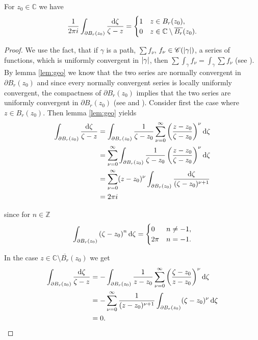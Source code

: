\begin{enumerate}[label = \textbf{Exercise \arabic*.},wide = 0pt, itemsep=1.5ex]
	\begin{proposition}
		For $z_0 \in \mathbb{C}$ we have
		\begin{align}
			\frac{1}{2\pi i}\int_{\partial B_r(z_0)} \frac{\mathop{}\!\mathrm{d} \zeta}{\zeta - z} = \begin{cases}
				1 & z \in B_r(z_0),\\
				0 & z \in \mathbb{C} \setminus \overline{B_r}(z_0).
			\end{cases}
		\end{align}
	\end{proposition}

	\begin{proof}
		We use the fact, that if $\gamma$ is a path, $\sum f_\nu$, $f_\nu \in \mathscr{C}(\abs[0]{\gamma})$, a series of functions, which is uniformly convergent in $\abs[0]{\gamma}$, then $\sum\int_\gamma f_\nu = \int_\gamma \sum f_\nu$ (see \cite[163]{remmert2002funktionentheorie}). By lemma \ref{lem:geo} we know that the two series are normally convergent in $\partial B_r(z_0)$ and since every normally convergent series is locally uniformly convergent, the compactness of $\partial B_r(z_0)$ implies that the two series are uniformly convergent in $\partial B_r(z_0)$ (see \cite[92]{remmert2002funktionentheorie} and \cite[85]{remmert2002funktionentheorie}). Consider first the case where $z \in B_r(z_0)$. Then lemma \ref{lem:geo} yields
		\begin{align*}
			\int_{\partial B_r(z_0)} \frac{\d \zeta}{\zeta - z} &= \int_{\partial B_r(z_0)} \frac{1}{\zeta - z_0}\sum_{\nu = 0}^\infty \del{\frac{z - z_0}{\zeta - z_0}}^{\nu} \d \zeta\\
			&= \sum_{\nu = 0}^\infty\int_{\partial B_r(z_0)} \frac{1}{\zeta - z_0}\del{\frac{z - z_0}{\zeta - z_0}}^{\nu} \d \zeta\\
			&= \sum_{\nu = 0}^\infty (z - z_0)^\nu \int_{\partial B_r(z_0)} \frac{\d\zeta}{(\zeta - z_0)^{\nu + 1}}\\
			&= 2\pi i
		\end{align*}

		\noindent since for $n \in \mathbb{Z}$
		\begin{align}
			\int_{\partial B_r(z_0)} \del[0]{\zeta - z_0}^n \d\zeta = \begin{cases}
				0 & n \neq -1,\\
				2\pi  & n = -1.
			\end{cases}
		\end{align}

		In the case $z \in \mathbb{C} \setminus \overline{B_r}(z_0)$ we get
		\begin{align*}
			\int_{\partial B_r(z_0)} \frac{\d \zeta}{\zeta - z} &= -\int_{\partial B_r(z_0)} \frac{1}{z - z_0} \sum_{\nu = 0}^\infty \del{\frac{\zeta - z_0}{z - z_0}}^{\nu} \d \zeta\\
			&= -\sum_{\nu = 0}^\infty \frac{1}{(z - z_0)^{\nu + 1}}\int_{\partial B_r(z_0)} (\zeta - z_0)^\nu \d \zeta\\
			&= 0. 
		\end{align*}
	\end{proof}
\end{enumerate}
\printbibliography

